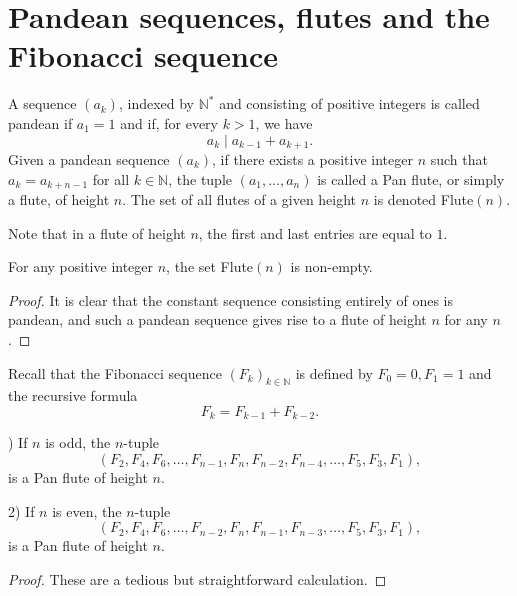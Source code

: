 
\chapter{Pandean sequences, flutes and the Fibonacci sequence}
\begin{definition}
    \label{def:flute}
    \leanok
    A sequence $(a_k)$, indexed by $\mathbb{N}^*$ and consisting of positive integers is called pandean if $a_1 = 1$ and 
    if, for every $k > 1$, we have
    \[
        a_k \mid a_{k-1} + a_{k+1}.
    \]
    Given a pandean sequence $(a_k)$, if there exists a positive integer $n$ such that $a_k = a_{k+n-1}$ for all $k\in \mathbb{N}$, 
    the tuple $(a_1, \ldots, a_n)$ is called a Pan flute, or simply a flute, of height $n$. The set of all flutes of a given height $n$ 
    is denoted Flute$(n)$.
\end{definition}
Note that in a flute of height $n$, the first and last entries are equal to $1$. 
\begin{lemma}
    \label{l:nFluteNonEmpty}
    \leanok
    For any positive integer $n$, the set Flute$(n)$ is non-empty.
\end{lemma}
\begin{proof}
    \leanok
    It is clear that the constant sequence consisting 
    entirely of ones is pandean, and such a pandean sequence gives rise to a flute of height $n$ for any $n$.
\end{proof}
Recall that the Fibonacci sequence $(F_k)_{k \in \mathbb{N}}$ is defined by $F_0 = 0, F_1 = 1$ and the recursive formula
    \[
        F_k = F_{k-1} + F_{k-2}.
    \]


\begin{lemma}
    \label{l:FibFlute}
    ) If $n$ is odd, the $n$-tuple 
    \[
        (F_2,F_4, F_6, \ldots, F_{n-1}, F_{n}, F_{n-2}, F_{n-4}, \ldots, F_5, F_3, F_1), 
    \]
    is a Pan flute of height $n$.

    2) If $n$ is even, the $n$-tuple 
    \[
        (F_2, F_4, F_6, \ldots, F_{n-2}, F_{n}, F_{n-1}, F_{n-3}, \ldots, F_5, F_3,F_1),
    \]
    is a Pan flute of height $n$. 
\end{lemma}
\begin{proof}
    These are a tedious but straightforward calculation.
\end{proof}

